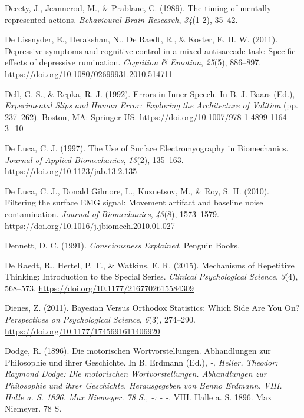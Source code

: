 \documentclass[a4paper,12pt,twoside,openright,oldfontcommands]{memoir}
\begin{document}
\leavevmode\hypertarget{ref-decety_timing_1989}{}%
Decety, J., Jeannerod, M., \& Prablanc, C. (1989). The timing of mentally represented actions. \emph{Behavioural Brain Research}, \emph{34}(1-2), 35--42.

\leavevmode\hypertarget{ref-DeLissnyder2011}{}%
De Lissnyder, E., Derakshan, N., De Raedt, R., \& Koster, E. H. W. (2011). Depressive symptoms and cognitive control in a mixed antisaccade task: Specific effects of depressive rumination. \emph{Cognition \& Emotion}, \emph{25}(5), 886--897. \url{https://doi.org/10.1080/02699931.2010.514711}

\leavevmode\hypertarget{ref-dell_errors_1992}{}%
Dell, G. S., \& Repka, R. J. (1992). Errors in Inner Speech. In B. J. Baars (Ed.), \emph{Experimental Slips and Human Error: Exploring the Architecture of Volition} (pp. 237--262). Boston, MA: Springer US. \url{https://doi.org/10.1007/978-1-4899-1164-3_10}

\leavevmode\hypertarget{ref-de_luca_use_1997}{}%
De Luca, C. J. (1997). The Use of Surface Electromyography in Biomechanics. \emph{Journal of Applied Biomechanics}, \emph{13}(2), 135--163. \url{https://doi.org/10.1123/jab.13.2.135}

\leavevmode\hypertarget{ref-de_luca_filtering_2010}{}%
De Luca, C. J., Donald Gilmore, L., Kuznetsov, M., \& Roy, S. H. (2010). Filtering the surface EMG signal: Movement artifact and baseline noise contamination. \emph{Journal of Biomechanics}, \emph{43}(8), 1573--1579. \url{https://doi.org/10.1016/j.jbiomech.2010.01.027}

\leavevmode\hypertarget{ref-dennett_consciousness_1991}{}%
Dennett, D. C. (1991). \emph{Consciousness Explained}. Penguin Books.

\leavevmode\hypertarget{ref-de_raedt_mechanisms_2015}{}%
De Raedt, R., Hertel, P. T., \& Watkins, E. R. (2015). Mechanisms of Repetitive Thinking: Introduction to the Special Series. \emph{Clinical Psychological Science}, \emph{3}(4), 568--573. \url{https://doi.org/10.1177/2167702615584309}

\leavevmode\hypertarget{ref-dienes_bayesian_2011}{}%
Dienes, Z. (2011). Bayesian Versus Orthodox Statistics: Which Side Are You On? \emph{Perspectives on Psychological Science}, \emph{6}(3), 274--290. \url{https://doi.org/10.1177/1745691611406920}

\leavevmode\hypertarget{ref-dodge_motorischen_1896}{}%
Dodge, R. (1896). Die motorischen Wortvorstellungen. Abhandlungen zur Philosophie und ihrer Geschichte. In B. Erdmann (Ed.), \emph{-, Heller, Theodor: Raymond Dodge: Die motorischen Wortvorstellungen. Abhandlungen zur Philosophie und ihrer Geschichte. Herausgegeben von Benno Erdmann. VIII. Halle a. S. 1896. Max Niemeyer. 78 S., -: - -.} VIII. Halle a. S. 1896. Max Niemeyer. 78 S.
\end{document}
